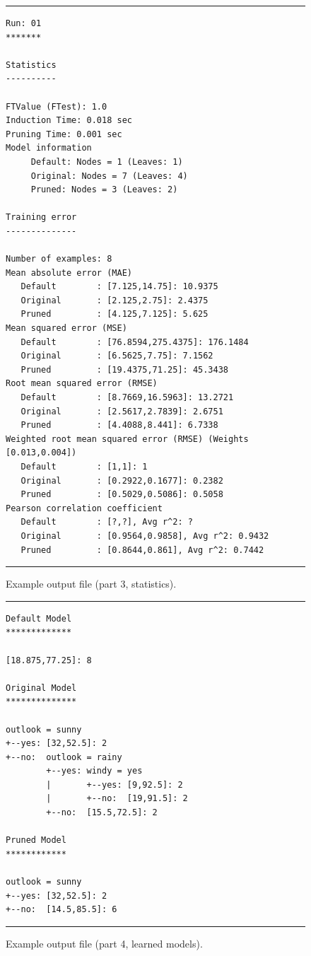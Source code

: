\documentclass[a4paper]{report}
\begin{document}
\begin{figure}[tb]
\hrule\vspace{1em}
\footnotesize
\begin{verbatim}
Run: 01
*******

Statistics
----------

FTValue (FTest): 1.0
Induction Time: 0.018 sec
Pruning Time: 0.001 sec
Model information
     Default: Nodes = 1 (Leaves: 1)
     Original: Nodes = 7 (Leaves: 4)
     Pruned: Nodes = 3 (Leaves: 2)

Training error
--------------

Number of examples: 8
Mean absolute error (MAE)
   Default        : [7.125,14.75]: 10.9375
   Original       : [2.125,2.75]: 2.4375
   Pruned         : [4.125,7.125]: 5.625
Mean squared error (MSE)
   Default        : [76.8594,275.4375]: 176.1484
   Original       : [6.5625,7.75]: 7.1562
   Pruned         : [19.4375,71.25]: 45.3438
Root mean squared error (RMSE)
   Default        : [8.7669,16.5963]: 13.2721
   Original       : [2.5617,2.7839]: 2.6751
   Pruned         : [4.4088,8.441]: 6.7338
Weighted root mean squared error (RMSE) (Weights [0.013,0.004])
   Default        : [1,1]: 1
   Original       : [0.2922,0.1677]: 0.2382
   Pruned         : [0.5029,0.5086]: 0.5058
Pearson correlation coefficient
   Default        : [?,?], Avg r^2: ?
   Original       : [0.9564,0.9858], Avg r^2: 0.9432
   Pruned         : [0.8644,0.861], Avg r^2: 0.7442
\end{verbatim}
\hrule
\caption{Example output file (part 3, statistics).}
\label{output3:fig}
\end{figure}

\begin{figure}[tb]
\hrule\vspace{1em}
\begin{verbatim}
Default Model
*************

[18.875,77.25]: 8

Original Model
**************

outlook = sunny
+--yes: [32,52.5]: 2
+--no:  outlook = rainy
        +--yes: windy = yes
        |       +--yes: [9,92.5]: 2
        |       +--no:  [19,91.5]: 2
        +--no:  [15.5,72.5]: 2

Pruned Model
************

outlook = sunny
+--yes: [32,52.5]: 2
+--no:  [14.5,85.5]: 6
\end{verbatim}
\hrule
\caption{Example output file (part 4, learned models).}
\label{output4:fig}
\end{figure}
\end{document}
